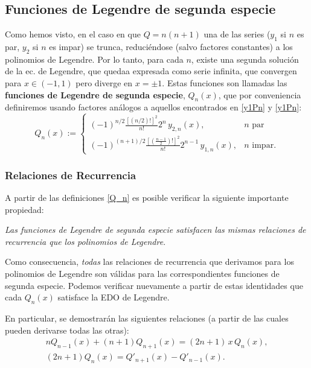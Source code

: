 \subsection{Funciones de Legendre de segunda especie}
Como hemos visto, en el caso en que $Q=n(n+1)$ una de las series ($y_1$ si $n$ es par, $y_2$ si $n$ es impar) se trunca, reduciéndose (salvo factores constantes) a los polinomios de Legendre. Por lo tanto, para cada $n$, existe una segunda solución de la ec. de Legendre, que quedaa expresada como serie infinita, que convergen para $x\in(-1,1)$ pero diverge en $x=\pm 1$. Estas funciones son llamadas las \textbf{funciones de Legendre de segunda especie}, $Q_n(x)$, que por conveniencia definiremos usando factores análogos a aquellos encontrados en \eqref{y1Pn} y \eqref{y1Pn}:
\begin{equation}
Q_n(x):=
	\begin{cases}
	(-1)^{n/2}\frac{[(n/2)!]^2}{n!} 2^n\, y_{2,n}(x), & n \text{ par}\\
	(-1)^{(n+1)/2}\frac{\left[\left(\frac{n-1}{2}\right)!\right]^2}{n!}2^{n-1}\, y_{1,n}(x), & n \text{ impar}.
	\end{cases} \label{Q_n}
\end{equation}

\subsubsection{Relaciones de Recurrencia}
A partir de las definiciones \eqref{Q_n} es posible verificar la siguiente importante propiedad: 
\begin{tcolorbox}
\textit{Las funciones de Legendre de segunda especie satisfacen las mismas relaciones de recurrencia que los polinomios de Legendre}.
\end{tcolorbox}

Como consecuencia, \textit{todas} las relaciones de recurrencia que derivamos para los polinomios de Legendre son válidas para las correspondientes funciones de segunda especie. Podemos verificar nuevamente a partir de estas identidades que cada $Q_n(x)$ satisface la EDO de Legendre.

En particular, se demostrarán las siguientes relaciones (a partir de las cuales pueden derivarse todas las otras):
\begin{gather}
nQ_{n-1}(x)+(n+1)Q_{n+1}(x)=(2n+1)\,x\,Q_n(x) , \label{nQn-1}\\
(2n+1)Q_n(x)=Q'_{n+1}(x)-Q'_{n-1}(x).
\end{gather}

